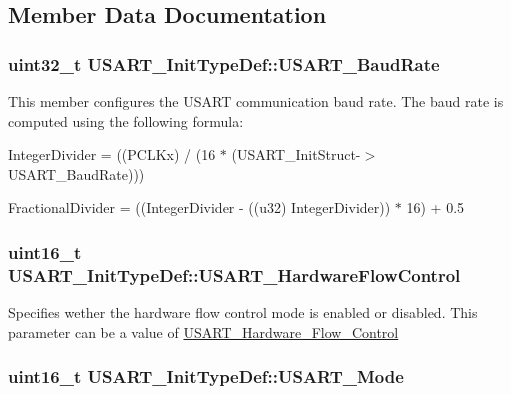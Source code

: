 \subsection{Member Data Documentation}
\hypertarget{structUSART__InitTypeDef_a6f763cb0e6044f838ee764ce437997b2}{
\subsubsection[{USART\_\-BaudRate}]{\setlength{\rightskip}{0pt plus 5cm}uint32\_\-t {\bf USART\_\-InitTypeDef::USART\_\-BaudRate}}}
\label{structUSART__InitTypeDef_a6f763cb0e6044f838ee764ce437997b2}
This member configures the USART communication baud rate. The baud rate is computed using the following formula:
\begin{DoxyItemize}
\item IntegerDivider = ((PCLKx) / (16 $\ast$ (USART\_\-InitStruct-\/$>$USART\_\-BaudRate)))
\item FractionalDivider = ((IntegerDivider -\/ ((u32) IntegerDivider)) $\ast$ 16) + 0.5 
\end{DoxyItemize}\hypertarget{structUSART__InitTypeDef_a9996edf3bfd90c36f03b4075969703f5}{
\subsubsection[{USART\_\-HardwareFlowControl}]{\setlength{\rightskip}{0pt plus 5cm}uint16\_\-t {\bf USART\_\-InitTypeDef::USART\_\-HardwareFlowControl}}}
\label{structUSART__InitTypeDef_a9996edf3bfd90c36f03b4075969703f5}
Specifies wether the hardware flow control mode is enabled or disabled. This parameter can be a value of \hyperlink{group__USART__Hardware__Flow__Control}{USART\_\-Hardware\_\-Flow\_\-Control} \hypertarget{structUSART__InitTypeDef_a7d944d35d7d1fc79a63f249615148584}{
\subsubsection[{USART\_\-Mode}]{\setlength{\rightskip}{0pt plus 5cm}uint16\_\-t {\bf USART\_\-InitTypeDef::USART\_\-Mode}}}

